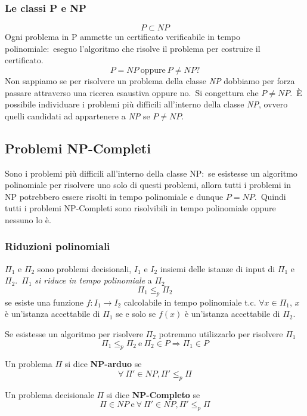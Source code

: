 \subsubsection{Le classi P e NP}

\[P \subset NP\]
Ogni problema in P ammette un certificato verificabile in tempo polinomiale:\ eseguo l'algoritmo che risolve il problema per costruire il certificato.\
\[\mathit{P} = \mathit{NP}\ \mathrm{oppure}\ \mathit{P} \neq \mathit{NP}?\]
Non sappiamo se per risolvere un problema della classe \textit{NP} dobbiamo per forza passare attraverso una ricerca esaustiva oppure no.\
Si congettura che $\mathit{P} \neq \mathit{NP}$.\
È possibile individuare i problemi più difficili all'interno della classe \textit{NP}, ovvero quelli candidati ad appartenere a \textit{NP} se $\mathit{P} \neq \mathit{NP}$.\

\subsection{Problemi NP-Completi}
Sono i problemi più difficili all'interno della classe NP:\ se esistesse un algoritmo polinomiale per risolvere uno solo di questi problemi, allora tutti i problemi in NP potrebbero essere risolti in tempo polinomiale e dunque $\mathit{P} = \mathit{NP}$.\
Quindi tutti i problemi NP-Completi sono risolvibili in tempo polinomiale oppure nessuno lo è.\

\subsubsection{Riduzioni polinomiali}

$\Pi_1$ e $\Pi_2$ sono problemi decisionali, $I_1$ e $I_2$ insiemi delle istanze di input di $\Pi_1$ e $\Pi_2$.\
$\Pi_1$ \textit{si riduce in tempo polinomiale} a $\Pi_2$
\[\Pi_1 \leq_p \Pi_2\]
se esiste una funzione $f: I_1 \rightarrow I_2$ calcolabile in tempo polinomiale t.c. $\forall x \in \Pi_1$, $x$ è un'istanza accettabile di $\Pi_1$ se e solo se $f(x)$ è un'istanza accettabile di $\Pi_2$.\

Se esistesse un algoritmo per risolvere $\Pi_2$ potremmo utilizzarlo per risolvere $\Pi_1$
\[\Pi_1 \leq_p \Pi_2\ \mathrm{e}\ \Pi_2 \in \mathit{P} \Rightarrow \Pi_1 \in \mathit{P}\]

\noindent Un problema $\Pi$ si dice \textbf{NP-arduo} se
\[\forall\ \Pi' \in \mathit{NP}, \Pi' \leq_p \Pi\]

\noindent Un problema decisionale $\Pi$ si dice \textbf{NP-Completo} se
\[\Pi \in \mathit{NP}\ \mathrm{e}\ \forall\ \Pi' \in \mathit{NP}, \Pi' \leq_p \Pi\]

